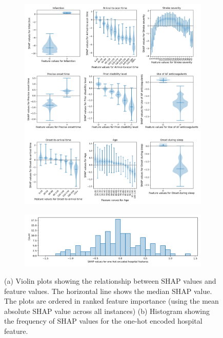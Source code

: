 \begin{figure}%
\centering
\begin{subfigure}{.9\textwidth}
  \centering
    \includegraphics[width=1.\textwidth]{./images/03d_xgb_10_features_thrombolysis_shap_violin_all_features}
    \caption{}
  \label{fig:shap_feature_subfigure_a}
\end{subfigure}
\begin{subfigure}{.9\textwidth}
  \centering
    \includegraphics[width=1.\textwidth]{./images/03d_xgb_10_features_hosp_shap_hist}
    \caption{}
  \label{fig:shap_feature_subfigure_b}
\end{subfigure}
\caption{(a) Violin plots showing the relationship between SHAP values and feature values. The horizontal line shows the median SHAP value. The plots are ordered in ranked feature importance (using the mean absolute SHAP value across all instances) (b) Histogram showing the frequency of SHAP values for the one-hot encoded hospital feature.}
\end{figure}

